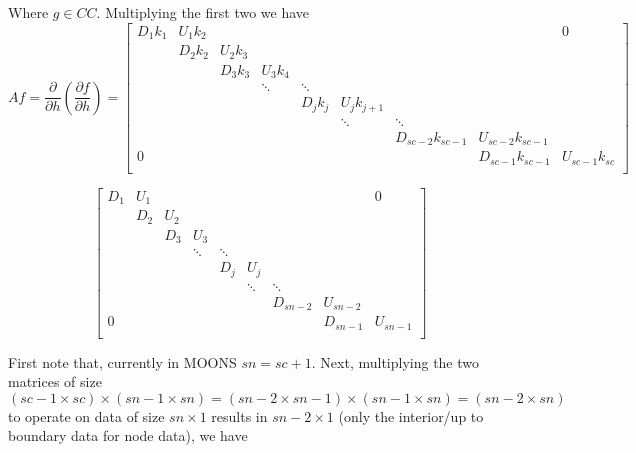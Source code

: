 \documentclass[11pt]{article}
\begin{document}
Where $g \in CC$. Multiplying the first two we have
\[
Af = 
\frac{\partial}{\partial h} \left( \frac{\partial f}{\partial h} \right)
=
\left[
\begin{array}{ccccccccc}
D_{1} k_{1} & U_{1} k_{2} &  &   &   &   &   &   & 0 \\
  & D_{2} k_{2} & U_{2} k_{3} &   &   &   &   &   &   \\
  &   & D_{3} k_{3} & U_{3} k_{4} &   &   &   &   &   \\
  &   &  & \ddots & \ddots &   &   &   &   \\
  &   &   &   & D_{j} k_{j} & U_{j} k_{j+1} &   &   &   \\
  &   &   &   &  & \ddots & \ddots &   &   \\
  &   &   &   &   &   & D_{sc-2} k_{sc-1} & U_{sc-2} k_{sc-1} &   \\
 0 &   &   &   &   &   &   & D_{sc-1} k_{sc-1} & U_{sc-1} k_{sc} \\
\end{array}
\right]
\]

\[
\left[
\begin{array}{ccccccccc}
D_{1} & U_{1} &  &   &   &   &   &   & 0 \\
  & D_{2} & U_{2} &   &   &   &   &   &   \\
  &   & D_{3} & U_{3} &   &   &   &   &   \\
  &   &  & \ddots & \ddots &   &   &   &   \\
  &   &   &   & D_{j} & U_{j} &   &   &   \\
  &   &   &   &  & \ddots & \ddots &   &   \\
  &   &   &   &   &   & D_{sn-2} & U_{sn-2} &   \\
 0 &   &   &   &   &   &   & D_{sn-1} & U_{sn-1} \\
\end{array}
\right]
\]

First note that, currently in MOONS $sn = sc + 1$. Next, multiplying the two matrices of size 
$(sc-1 \times sc) \times (sn-1 \times sn) = (sn-2 \times sn-1) \times (sn-1 \times sn) = (sn-2 \times sn)$ to operate on data of size $sn \times 1$ results in $sn-2 \times 1$ (only the interior/up to boundary data for node data), we have
\end{document}
